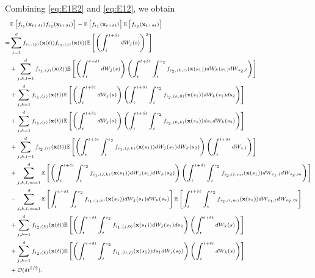 Combining \eqref{eq:E1E2} and \eqref{eq:E12}, we obtain
%
\begin{equation} \label{eq:E12_E1E2}
\scriptsize
\begin{aligned}
&\mathbb{E} \left[ f_{i_1}(\mathbf{x}_{t + \delta t}) f_{i_2}(\mathbf{x}_{t + \delta t}) \right]
- \mathbb{E} \left[ f_{i_1}(\mathbf{x}_{t + \delta t}) \right] \mathbb{E} \left[ f_{i_2}(\mathbf{x}_{t + \delta t}) \right] \\
=&
 \sum_{j=1}^d f_{{i_1},(j)}(\mathbf{x}(t)) f_{{i_2},(j)}(\mathbf{x}(t)) \mathbb{E} \left[ \left( \int_t^{t + \delta t} dW_j(s) \right)^2 \right] \\
&+ \sum_{j,k,l=1}^d f_{{i_1},(j)}(\mathbf{x}(t)) \mathbb{E} \left[ \left( \int_t^{t + \delta t} dW_j(s) \right) \left( \int_t^{t+\delta t} \int_t^{s_2} f_{{i_2},(k,l)}(\mathbf{x}(s_1)) dW_k(s_1) dW_{s_2, l} \right) \right] \\
&+ \sum_{j,k=1}^d f_{{i_1},(j)}(\mathbf{x}(t)) \mathbb{E} \left[ \left( \int_t^{t + \delta t} dW_j(s) \right)\left( \int_t^{t+\delta t} \int_t^{s_2} f_{{i_2},(k,0)}(\mathbf{x}(s_1)) dW_k(s_1) ds_2 \right) \right]\\
&+ \sum_{j, k=1}^d f_{{i_1},(j)}(\mathbf{x}(t)) \mathbb{E} \left[ \left( \int_t^{t + \delta t} dW_j(s) \right) \left( \int_t^{t+\delta t} \int_t^{s_2} f_{{i_2},(0,k)}(\mathbf{x}(s_1)) ds_1 dW_k(s_2) \right) \right] \\
&+  \sum_{j, k, l=1}^d  f_{{i_2},(l)}(\mathbf{x}(t))\mathbb{E} \left[ \left( \int_t^{t+\delta t} \int_t^{s_2} f_{{i_1},(j,k)}(\mathbf{x}(s_1)) dW_j(s_1) dW_k(s_2) \right) \left( \int_t^{t + \delta t} dW_{s,l} \right) \right] \\
&+ \sum_{j, k, l, m=1}^d \mathbb{E} \left[ \left( \int_t^{t+\delta t} \int_t^{s_2} f_{{i_1},(j,k)}(\mathbf{x}(s_1)) dW_j(s_1) dW_k(s_2) \right) \left( \int_t^{t+\delta t} \int_t^{s_2} f_{{i_2},(l,m)}(\mathbf{x}(s_1)) dW_{s_1, l} dW_{s_2, m} \right) \right] \\
&- \sum_{j, k, l, m =1}^d \mathbb{E} \left[ \int_t^{t+\delta t} \int_t^{s_2} f_{{i_1},(j,k)}(\mathbf{x}(s_1)) dW_j(s_1) dW_k(s_2) \right] \mathbb{E} \left[ \int_t^{t+\delta t} \int_t^{s_2} f_{{i_2},(l,m)}(\mathbf{x}(s_1)) dW_{s_1, l} dW_{s_2, m} \right] \\
&+  \sum_{j, k=1}^d f_{{i_2},(k)}(\mathbf{x}(t)) \mathbb{E} \left[ \left( \int_t^{t+\delta t} \int_t^{s_2} f_{{i_1},(j,0)}(\mathbf{x}(s_1)) dW_j(s_1) ds_2  \right) \left( \int_t^{t + \delta t} dW_k(s) \right) \right]\\
&+   \sum_{j, k=1}^d  f_{{i_2},(k)}(\mathbf{x}(t)) \mathbb{E} \left[ \left( \int_t^{t+\delta t} \int_t^{s_2} f_{{i_1},(0,j)}(\mathbf{x}(s_1)) ds_1 dW_j(s_2)  \right) \left(\int_t^{t + \delta t} dW_k(s) \right) \right] \\
&+ \mathcal{O} (\delta t^{5/2}) .
\end{aligned}
\end{equation}
